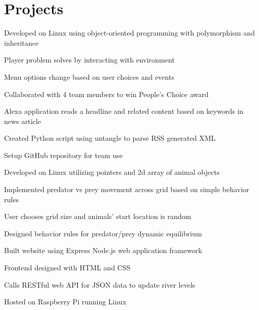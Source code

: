 \documentclass[]{deedy-resume-openfont}
\begin{document}
\begin{minipage}[t]{0.66\textwidth}


\section{Projects}
\vspace{\topsep} %
\begin{tightemize}
\item Developed on Linux using object-oriented programming with polymorphism and inheritance
\item Player problem solves by interacting with environment
\item Menu options change based on user choices and events
\end{tightemize}
\sectionsep

\begin{tightemize}
\item Collaborated with 4 team members to win People's Choice award
\item Alexa application reads a headline and related content based on keywords in news article
\item Created Python script using untangle to parse RSS generated XML
\item Setup GitHub repository for team use
\end{tightemize}
\sectionsep

\begin{tightemize}
\item Developed on Linux utilizing pointers and 2d array of animal objects
\item Implemented predator vs prey movement across grid based on simple behavior rules
\item User chooses grid size and animals' start location is random
\item Designed behavior rules for predator/prey dynamic equilibrium
\end{tightemize}
\sectionsep

\begin{tightemize}
\item Built website using Express Node.js web application framework
\item Frontend designed with HTML and CSS
\item Calls RESTful web API for JSON data to update river levels
\item Hosted on Raspberry Pi running Linux
\end{tightemize}
\sectionsep


\end{minipage}
\end{document}
